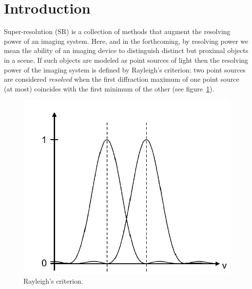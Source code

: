 \section{Introduction}\label{sec:introduction}
\localtableofcontents
Super-resolution (SR) is a collection of methods that augment the resolving power of an imaging system.
%
Here, and in the forthcoming, by resolving power we mean the ability of an imaging device to distinguish distinct but proximal objects in a scene.
%
If such objects are modeled as point sources of light then the resolving power of the imaging system is defined by Rayleigh's criterion: two point sources are considered \textit{resolved} when the first diffraction maximum of one point source (at most) coincides with the first minimum of the other (see figure~\ref{fig:rayleigh}).
\begin{figure}
	\center
	\includegraphics[width=\linewidth,keepaspectratio]{figures/classical/rayleigh.png}
	\caption{Rayleigh's criterion\cite{rayleigh}.}
	\label{fig:rayleigh}
\end{figure}

